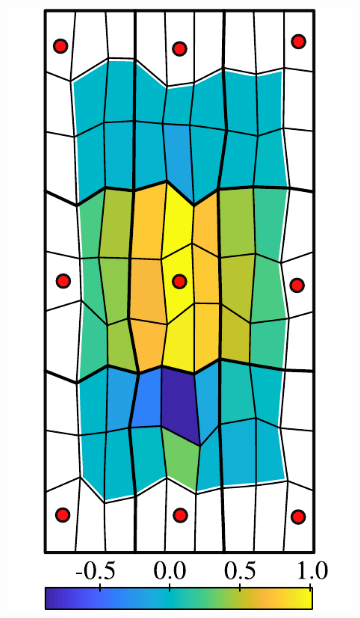 \begin{figure} [htbp]
\begin{subfigure}[t]{0.22\textwidth}
  \centerline{\includegraphics[width=\linewidth]{figs/MsRSB/MPFA_9x9_c}}
  \caption{\label{fig:mpfa_demo_orig}}
\end{subfigure}
\hfill
\begin{subfigure}[t]{0.22\textwidth}

\end{subfigure}
\end{figure}
